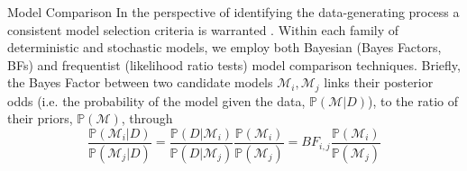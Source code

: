 \begin{minipage}{\textwidth}
\begin{mybox}{Model Comparison}
In the perspective of identifying the data-generating process a consistent model selection criteria is warranted \parencite{Hoge:PrimerModelSelection:2018}. Within each family of deterministic and stochastic models, we employ both Bayesian (Bayes Factors, BFs) and frequentist (likelihood ratio tests) model comparison techniques. Briefly, the Bayes Factor between two candidate models $\mathcal{M}_i, \mathcal{M}_j$ links their posterior odds (i.e. the probability of the model given the data, $\mathbb{P}(\mathcal{M}|D)$), to the ratio of their priors, $\mathbb{P}(\mathcal{M})$, through 
\begin{equation}
    \frac{\mathbb{P}(\mathcal{M}_i|D)}{\mathbb{P}(\mathcal{M}_j|D)} =   \frac{\mathbb{P}(D|\mathcal{M}_i)}{\mathbb{P}(D|\mathcal{M}_j)} \frac{\mathbb{P}(\mathcal{M}_i)}{\mathbb{P}(\mathcal{M}_j)} = BF_{i,j} \frac{\mathbb{P}(\mathcal{M}_i)}{\mathbb{P}(\mathcal{M}_j)}
\end{equation}

\end{mybox}
\end{minipage}

